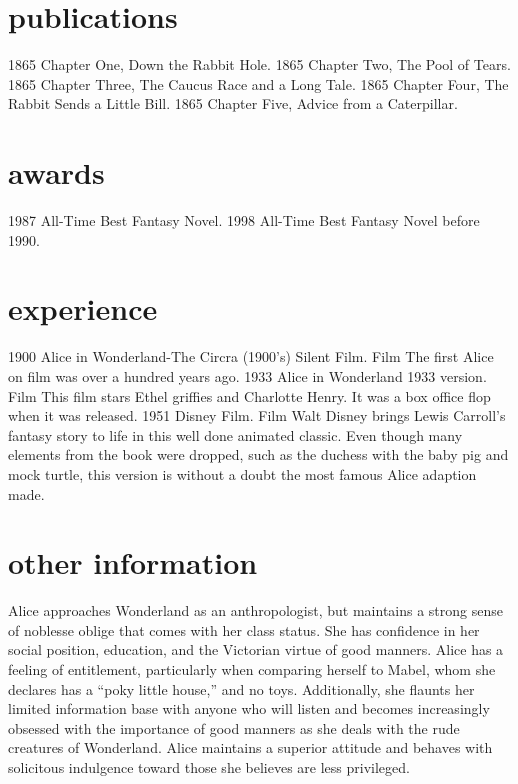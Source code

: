 \documentclass[]{mcec-cv}
\begin{document}
\section{publications}

\begin{twentyshort}
  \twentyitemshort
    {1865}
    {Chapter One, Down the Rabbit Hole.}
  \twentyitemshort
    {1865}
    {Chapter Two, The Pool of Tears.}
  \twentyitemshort
    {1865}
    {Chapter Three,  The Caucus Race and a Long Tale.}
  \twentyitemshort
    {1865}
    {Chapter Four,  The Rabbit Sends a Little Bill.}
  \twentyitemshort
    {1865}
    {Chapter Five,  Advice from a Caterpillar.}
\end{twentyshort}

\section{awards}

\begin{twentyshort}
  \twentyitemshort
    {1987}
    {All-Time Best Fantasy Novel.}
  \twentyitemshort
    {1998}
    {All-Time Best Fantasy Novel before 1990.}
\end{twentyshort}

\section{experience}

\begin{twenty}
  \twentyitem
    {1900}
    {Alice in Wonderland-The Circra (1900's) Silent Film.}
    {Film}
    {The first Alice on film was over a hundred years ago.}
  \twentyitem
    {1933}
    {Alice in Wonderland 1933 version.}
    {Film}
    {This film stars Ethel griffies and Charlotte Henry. It was a box office flop when it was released.}
\twentyitem
    {1951}
    {Disney Film.}
    {Film}
    {Walt Disney brings Lewis Carroll's fantasy story to life in this well done animated classic. Even though many elements from the book were dropped, such as the duchess with the baby pig and mock turtle, this version is without a doubt the most famous Alice adaption made.}

\end{twenty}

\section{other information}
Alice approaches Wonderland as an anthropologist, but maintains a strong sense of noblesse oblige that comes with her class status. She has confidence in her social position, education, and the Victorian virtue of good manners. Alice has a feeling of entitlement, particularly when comparing herself to Mabel, whom she declares has a “poky little house,” and no toys. Additionally, she flaunts her limited information base with anyone who will listen and becomes increasingly obsessed with the importance of good manners as she deals with the rude creatures of Wonderland. Alice maintains a superior attitude and behaves with solicitous indulgence toward those she believes are less privileged.
\end{document}
